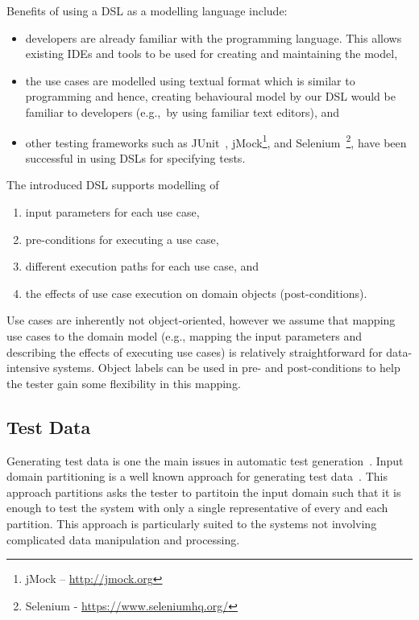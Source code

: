 Benefits of using a DSL as a modelling language include: 
\begin{itemize}
	\item developers are already familiar with the programming language. This allows existing IDEs and tools to be used for creating and maintaining the model,
	
	\item the use cases are modelled using textual format which is similar to programming and hence, creating behavioural model by our DSL would be familiar to developers (e.g.,\ by using familiar text editors), and 
	
	\item other testing frameworks such as JUnit~\cite{Beck2000}, jMock\footnote{ jMock – \url{http://jmock.org}}, and Selenium~\footnote{Selenium - \url{https://www.seleniumhq.org/}}, have been successful in using DSLs for specifying tests.
\end{itemize}

The introduced DSL supports modelling of
\begin{enumerate}
	\item input parameters for each use case,
	
	\item pre-conditions for executing a use case, 
	
	\item different execution paths for each use case, and
	
	\item the effects of use case execution on domain objects (post-conditions).
\end{enumerate}

Use cases are inherently not object-oriented, however we assume that mapping use cases to the domain model (e.g., mapping the input parameters and describing the effects of executing use cases) is relatively straightforward for data-intensive systems. Object labels can be used in pre- and post-conditions to help the tester gain some flexibility in this mapping.

\subsection{Test Data}
\label{sec:framework-overview-test-data}
Generating test data is one the main issues in automatic test generation~\cite{Ferguson1996}. Input domain partitioning is a well known approach for generating test data~\cite{Ammann2008}. This approach partitions asks the tester to partitoin the input domain such that it is enough to test the system with only a single representative of every and each partition. This approach is particularly suited to the systems not involving complicated data manipulation and processing. 


